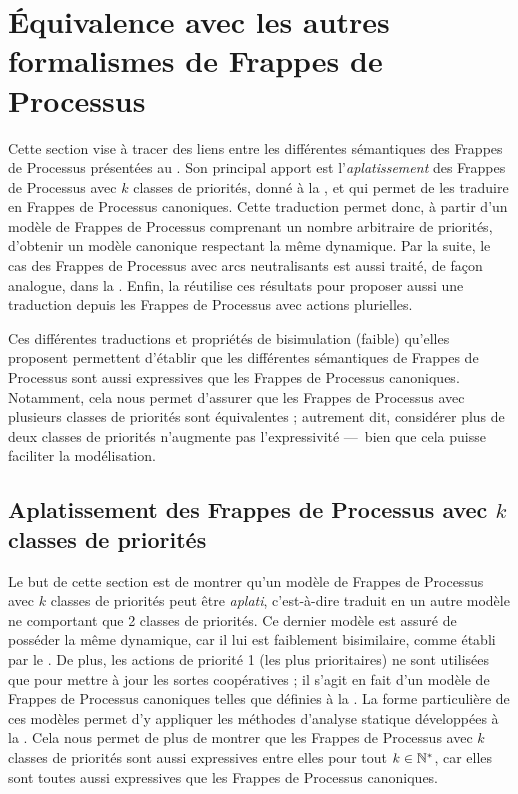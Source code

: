 \section{Équivalence avec les autres formalismes de Frappes de Processus}

Cette section vise à tracer des liens entre les différentes sémantiques des Frappes de Processus
présentées au .
Son principal apport est l'\emph{aplatissement} des Frappes de Processus avec $k$
classes de priorités, donné à la ,
et qui permet de les traduire en Frappes de Processus canoniques.
Cette traduction permet donc, à partir d'un modèle de Frappes de Processus comprenant un nombre
arbitraire de priorités, d'obtenir un modèle canonique respectant la même dynamique.
Par la suite, le cas des Frappes de Processus avec arcs neutralisants est aussi traité,
de façon analogue, dans la .
Enfin, la  réutilise ces résultats pour proposer aussi une traduction
depuis les Frappes de Processus avec actions plurielles.

Ces différentes traductions et propriétés de bisimulation (faible) qu'elles proposent
permettent d'établir que les différentes sémantiques de Frappes de Processus sont
aussi expressives que les Frappes de Processus canoniques.
Notamment, cela nous permet d'assurer que les Frappes de Processus avec plusieurs
classes de priorités sont équivalentes ;
autrement dit, considérer plus de deux classes de priorités n'augmente pas l'expressivité
---~bien que cela puisse faciliter la modélisation.



\subsection{Aplatissement des Frappes de Processus avec $k$ classes de priorités}

Le but de cette section est de montrer qu'un modèle de Frappes de Processus avec $k$ classes
de priorités peut être \emph{aplati}, c'est-à-dire traduit en un autre modèle ne comportant
que 2 classes de priorités.
Ce dernier modèle est assuré de posséder la même dynamique,
car il lui est faiblement bisimilaire,
comme établi par le .
De plus, les actions de priorité 1 (les plus prioritaires) ne sont utilisées que pour mettre
à jour les sortes coopératives ;
il s'agit en fait d'un modèle de Frappes de Processus canoniques telles que définies
à la .
La forme particulière de ces modèles permet d'y appliquer les méthodes d'analyse statique
développées à la .
Cela nous permet de plus de montrer que les Frappes de Processus avec $k$ classes de priorités
sont aussi expressives entre elles pour tout $k \in \mathbb{N}^*$,
car elles sont toutes aussi expressives que les Frappes de Processus canoniques.

